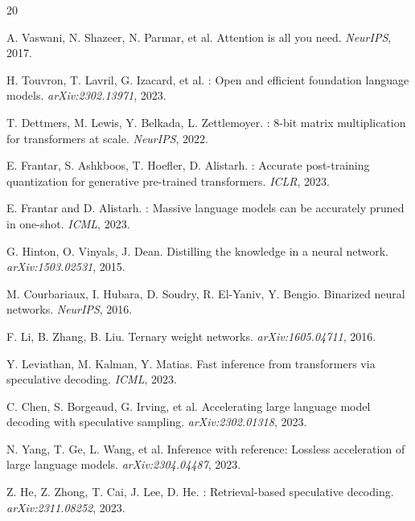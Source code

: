 \documentclass[10pt,twocolumn]{article}
\begin{document}

\begin{thebibliography}{20}

A. Vaswani, N. Shazeer, N. Parmar, et al.
\newblock Attention is all you need.
\newblock \emph{NeurIPS}, 2017.

H. Touvron, T. Lavril, G. Izacard, et al.
: Open and efficient foundation language models.
\newblock \emph{arXiv:2302.13971}, 2023.

T. Dettmers, M. Lewis, Y. Belkada, L. Zettlemoyer.
: 8-bit matrix multiplication for transformers at scale.
\newblock \emph{NeurIPS}, 2022.

E. Frantar, S. Ashkboos, T. Hoefler, D. Alistarh.
: Accurate post-training quantization for generative pre-trained transformers.
\newblock \emph{ICLR}, 2023.

E. Frantar and D. Alistarh.
: Massive language models can be accurately pruned in one-shot.
\newblock \emph{ICML}, 2023.

G. Hinton, O. Vinyals, J. Dean.
\newblock Distilling the knowledge in a neural network.
\newblock \emph{arXiv:1503.02531}, 2015.

M. Courbariaux, I. Hubara, D. Soudry, R. El-Yaniv, Y. Bengio.
\newblock Binarized neural networks.
\newblock \emph{NeurIPS}, 2016.

F. Li, B. Zhang, B. Liu.
\newblock Ternary weight networks.
\newblock \emph{arXiv:1605.04711}, 2016.

Y. Leviathan, M. Kalman, Y. Matias.
\newblock Fast inference from transformers via speculative decoding.
\newblock \emph{ICML}, 2023.

C. Chen, S. Borgeaud, G. Irving, et al.
\newblock Accelerating large language model decoding with speculative sampling.
\newblock \emph{arXiv:2302.01318}, 2023.

N. Yang, T. Ge, L. Wang, et al.
\newblock Inference with reference: Lossless acceleration of large language models.
\newblock \emph{arXiv:2304.04487}, 2023.

Z. He, Z. Zhong, T. Cai, J. Lee, D. He.
: Retrieval-based speculative decoding.
\newblock \emph{arXiv:2311.08252}, 2023.


\end{thebibliography}
\end{document}

